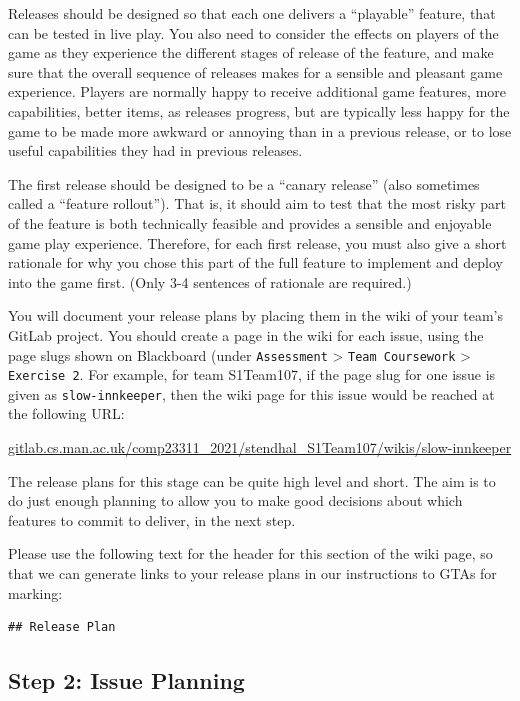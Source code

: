 \documentclass[
]{book}
\begin{document}
Releases should be designed so that each one delivers a ``playable'' feature, that can be tested in live play. You also need to consider the effects on players of the game as they experience the different stages of release of the feature, and make sure that the overall sequence of releases makes for a sensible and pleasant game experience. Players are normally happy to receive additional game features, more capabilities, better items, as releases progress, but are typically less happy for the game to be made more awkward or annoying than in a previous release, or to lose useful capabilities they had in previous releases.

The first release should be designed to be a ``canary release'' (also sometimes called a ``feature rollout''). That is, it should aim to test that the most risky part of the feature is both technically feasible and provides a sensible and enjoyable game play experience. Therefore, for each first release, you must also give a short rationale for why you chose this part of the full feature to implement and deploy into the game first. (Only 3-4 sentences of rationale are required.)

You will document your release plans by placing them in the wiki of your team's GitLab project. You should create a page in the wiki for each issue, using the page slugs shown on Blackboard (under \texttt{Assessment} \textgreater{} \texttt{Team\ Coursework} \textgreater{} \texttt{Exercise\ 2}. For example, for team S1Team107, if the page slug for one issue is given as \texttt{slow-innkeeper}, then the wiki page for this issue would be reached at the following URL:

\href{https://gitlab.cs.man.ac.uk/comp23311_2021/stendhal_S1Team107/wikis/slow-innkeeper}{gitlab.cs.man.ac.uk/comp23311\_2021/stendhal\_S1Team107/wikis/slow-innkeeper}

The release plans for this stage can be quite high level and short. The aim is to do just enough planning to allow you to make good decisions about which features to commit to deliver, in the next step.

Please use the following text for the header for this section of the wiki page, so that we can generate links to your release plans in our instructions to GTAs for marking:

\begin{verbatim}
## Release Plan
\end{verbatim}

\hypertarget{issueplan}{%
\subsection{Step 2: Issue Planning}\label{issueplan}}
\end{document}
